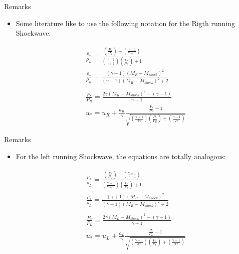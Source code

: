 \documentclass{beamer}
\begin{document}
\begin{frame}{Remarks}

  \begin{itemize}
  \item Some literature like to use the following notation for the Rigth running Shockwave:
  \end{itemize}
      \begin{eqnarray}
      && \frac{\rho_*}{\rho_R}=\frac{\left(\frac{P_*}{P_R}\right)+\left(\frac{\gamma-1}{\gamma+1}\right)}{\left(\frac{\gamma-1}{\gamma+1}\right)\left(\frac{P_*}{P_R}\right)+1} \nonumber \\
      && \frac{\rho_*}{\rho_R}=\frac{(\gamma+1)(M_R-M_{shock})^2}{(\gamma-1)(M_R-M_{shock})^2+2} \nonumber \\
      && \nonumber \\
      && \frac{P_*}{P_R}=\frac{2\gamma(M_R-M_{shock})^2-(\gamma-1)}{\gamma+1} \nonumber \\
      && u_*=u_R+\frac{a_R}{\gamma}\frac{\frac{P_*}{P_R}-1}{\sqrt{\left ( \frac{\gamma+1}{2\gamma} \right )\left ( \frac{P_*}{P_R} \right )+\left ( \frac{\gamma-1}{2\gamma} \right )}} \nonumber
    \end{eqnarray}
\end{frame}

\begin{frame}{Remarks}

  \begin{itemize}
  \item For the left running Shockwave, the equations are totally analogous:
  \end{itemize}
      \begin{eqnarray}
      && \frac{\rho_*}{\rho_L}=\frac{\left(\frac{P_*}{P_L}\right)+\left(\frac{\gamma-1}{\gamma+1}\right)}{\left(\frac{\gamma-1}{\gamma+1}\right)\left(\frac{P_*}{P_L}\right)+1} \nonumber \\
      && \frac{\rho_*}{\rho_L}=\frac{(\gamma+1)(M_R-M_{shock})^2}{(\gamma-1)(M_R-M_{shock})^2+2} \nonumber \\
      && \nonumber \\
      && \frac{P_*}{P_L}=\frac{2\gamma(M_L-M_{shock})^2-(\gamma-1)}{\gamma+1} \nonumber \\
      && u_*=u_L+\frac{a_L}{\gamma}\frac{\frac{P_*}{P_L}-1}{\sqrt{\left ( \frac{\gamma+1}{2\gamma} \right )\left ( \frac{P_*}{P_L} \right )+\left ( \frac{\gamma-1}{2\gamma} \right )}} \nonumber
    \end{eqnarray}
\end{frame}
\end{document}
